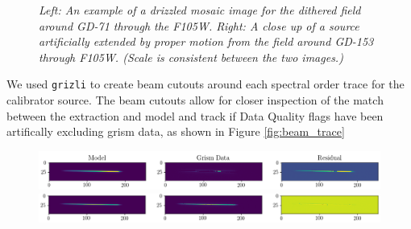 \documentclass[12pt]{article}
\begin{document}
{{%
\begin{figure}[h!]
\caption{\textit{Left: An example of a drizzled mosaic image for the dithered field around GD-71 through the F105W.
    Right: A close up of a source artificially extended by proper motion from the field around GD-153 through F105W. 
    (Scale is consistent between the two images.)}}
\label{fig:mosaics}
\end{figure}

We used \texttt{grizli} to create beam cutouts around each spectral order trace for the calibrator source. The
beam cutouts allow for closer inspection of the match between the extraction and model and track if Data Quality flags
have been artifically excluding grism data, as shown in Figure 
\ref{fig:beam_trace}


\begin{figure}[h!]
    \includegraphics[width=1\textwidth]{images/ex_mod_res.png}\\
   \includegraphics[width=1\textwidth]{images/better_mod_res.png}
    

\end{figure}}}
\end{document}
